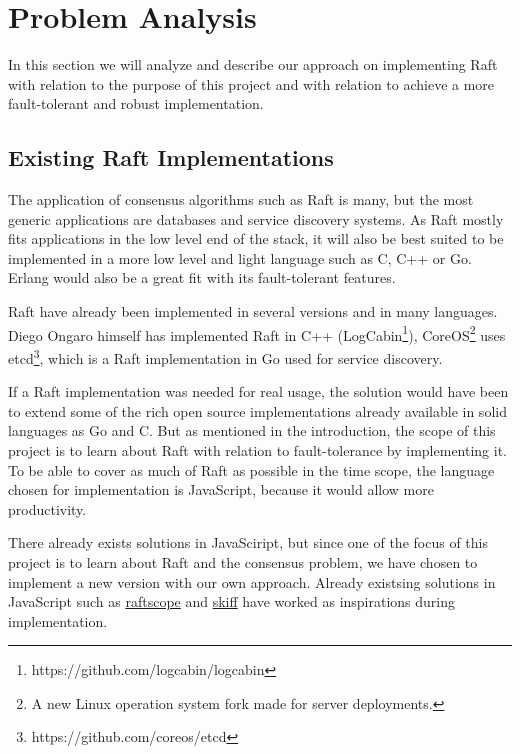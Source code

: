 \section{Problem Analysis} %
\label{sec:analysis}

In this section we will analyze and describe our approach on implementing Raft with relation to the purpose of this project and with relation to achieve a more fault-tolerant and robust implementation.

\subsection{Existing Raft Implementations} %
\label{sub:existing_raft_implementations}

The application of consensus algorithms such as Raft is many, but the most generic applications are databases and service discovery systems. As Raft mostly fits applications in the low level end of the stack, it will also be best suited to be implemented in a more low level and light language such as C, C++ or Go. Erlang would also be a great fit with its fault-tolerant features.

Raft have already been implemented in several versions and in many languages. Diego Ongaro himself has implemented Raft in C++ (LogCabin\footnote{https://github.com/logcabin/logcabin}), CoreOS\footnote{A new Linux operation system fork made for server deployments.} uses etcd\footnote{https://github.com/coreos/etcd}, which is a Raft implementation in Go used for service discovery.

If a Raft implementation was needed for real usage, the solution would have been to extend some of the rich open source implementations already available in solid languages as Go and C. But as mentioned in the introduction, the scope of this project is to learn about Raft with relation to fault-tolerance by implementing it. To be able to cover as much of Raft as possible in the time scope, the language chosen for implementation is JavaScript, because it would allow more productivity.

There already exists solutions in JavaSciript, but since one of the focus of this project is to learn about Raft and the consensus problem, we have chosen to implement a new version with our own approach. Already existsing solutions in JavaScript such as \href{https://github.com/ongardie/raftscope}{raftscope} and \href{https://github.com/pgte/skiff-algorithm}{skiff} have worked as inspirations during implementation.

